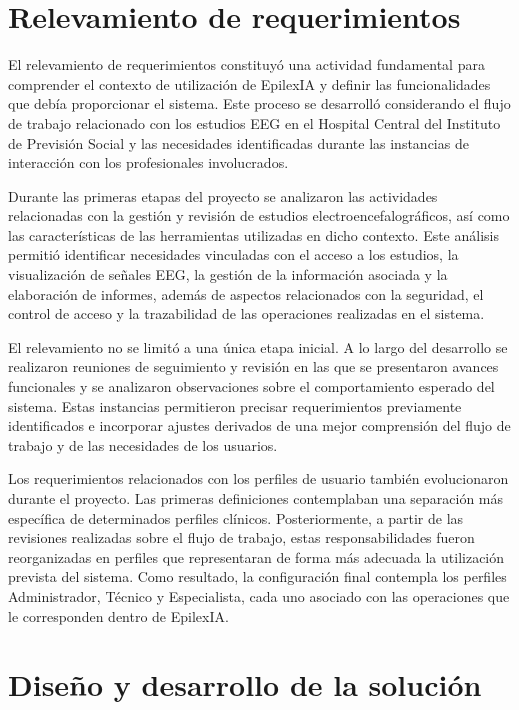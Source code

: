 \section{Relevamiento de requerimientos}
\label{sec:relevamiento-requerimientos}

El relevamiento de requerimientos constituyó una actividad fundamental para
comprender el contexto de utilización de EpilexIA y definir las funcionalidades
que debía proporcionar el sistema. Este proceso se desarrolló considerando el
flujo de trabajo relacionado con los estudios EEG en el Hospital Central del
Instituto de Previsión Social y las necesidades identificadas durante las
instancias de interacción con los profesionales involucrados.

Durante las primeras etapas del proyecto se analizaron las actividades
relacionadas con la gestión y revisión de estudios electroencefalográficos,
así como las características de las herramientas utilizadas en dicho contexto.
Este análisis permitió identificar necesidades vinculadas con el acceso a los
estudios, la visualización de señales EEG, la gestión de la información
asociada y la elaboración de informes, además de aspectos relacionados con la
seguridad, el control de acceso y la trazabilidad de las operaciones realizadas
en el sistema.

El relevamiento no se limitó a una única etapa inicial. A lo largo del
desarrollo se realizaron reuniones de seguimiento y revisión en las que se
presentaron avances funcionales y se analizaron observaciones sobre el
comportamiento esperado del sistema. Estas instancias permitieron precisar
requerimientos previamente identificados e incorporar ajustes derivados de una
mejor comprensión del flujo de trabajo y de las necesidades de los usuarios.

Los requerimientos relacionados con los perfiles de usuario también
evolucionaron durante el proyecto. Las primeras definiciones contemplaban una
separación más específica de determinados perfiles clínicos. Posteriormente,
a partir de las revisiones realizadas sobre el flujo de trabajo, estas
responsabilidades fueron reorganizadas en perfiles que representaran de forma
más adecuada la utilización prevista del sistema. Como resultado, la
configuración final contempla los perfiles Administrador, Técnico y
Especialista, cada uno asociado con las operaciones que le corresponden dentro
de EpilexIA.

\section{Diseño y desarrollo de la solución}
\label{sec:diseno-desarrollo-solucion}

